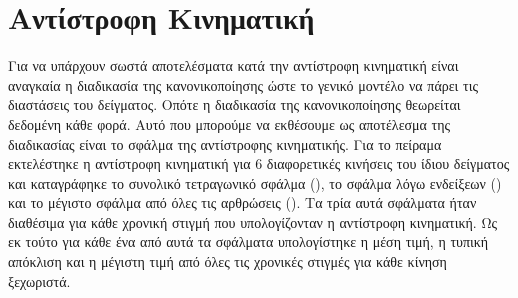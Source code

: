 \section{Αντίστροφη Κινηματική}

Για να υπάρχουν σωστά αποτελέσματα κατά την αντίστροφη κινηματική είναι αναγκαία η διαδικασία της κανονικοποίησης ώστε το γενικό μοντέλο να πάρει τις διαστάσεις του δείγματος. Οπότε η διαδικασία της κανονικοποίησης θεωρείται δεδομένη κάθε φορά. Αυτό που μπορούμε να εκθέσουμε ως αποτέλεσμα της διαδικασίας είναι το σφάλμα της αντίστροφης κινηματικής. Για το πείραμα εκτελέστηκε η αντίστροφη κινηματική για 6 διαφορετικές κινήσεις του ίδιου δείγματος και καταγράφηκε το συνολικό τετραγωνικό σφάλμα (), το σφάλμα λόγω ενδείξεων () και το μέγιστο σφάλμα από όλες τις αρθρώσεις (). Τα τρία αυτά σφάλματα ήταν διαθέσιμα για κάθε χρονική στιγμή που υπολογίζονταν η αντίστροφη κινηματική. Ως εκ τούτο για κάθε ένα από αυτά τα σφάλματα υπολογίστηκε η μέση τιμή, η τυπική απόκλιση και η μέγιστη τιμή από όλες τις χρονικές στιγμές για κάθε κίνηση ξεχωριστά.

